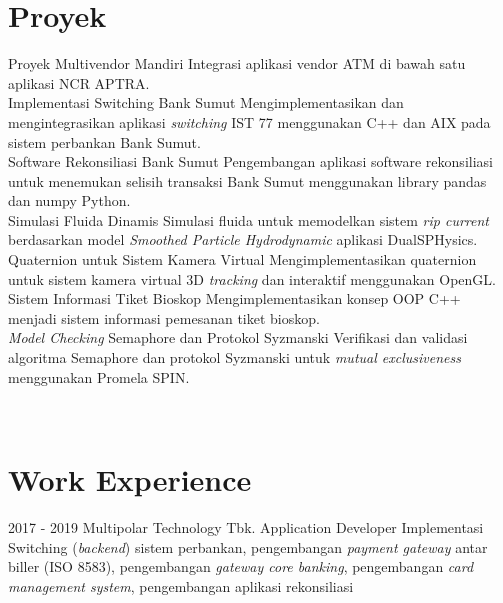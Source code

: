 \documentclass[]{friggeri-cv}
\begin{document}
\section{Proyek}
\begin{entrylist}
  \entry
    {}
    {Proyek Multivendor Mandiri}
    {}
    {Integrasi aplikasi vendor ATM di bawah satu aplikasi NCR APTRA.\\}
  \entry
    {}
    {Implementasi Switching Bank Sumut}
    {}
    {Mengimplementasikan dan mengintegrasikan aplikasi \textit{switching} IST 77 menggunakan C++ dan AIX pada sistem perbankan Bank Sumut.\\}
  \entry
    {}
    {Software Rekonsiliasi Bank Sumut}
    {}
    {Pengembangan aplikasi software rekonsiliasi untuk menemukan selisih transaksi Bank Sumut menggunakan library pandas dan numpy Python.\\}
  \entry
    {}
    {Simulasi Fluida Dinamis}
    {}
    {Simulasi fluida untuk memodelkan sistem \textit{rip current} berdasarkan model \textit{Smoothed Particle Hydrodynamic} aplikasi DualSPHysics.\\}
  \entry
    {}
    {Quaternion untuk Sistem Kamera Virtual}
    {}
    {Mengimplementasikan quaternion untuk sistem kamera virtual 3D \textit{tracking} dan interaktif menggunakan OpenGL.\\}
  \entry
    {}
    {Sistem Informasi Tiket Bioskop}
    {}
    {Mengimplementasikan konsep OOP C++ menjadi sistem informasi pemesanan tiket bioskop.\\}
  \entry
	{}
	{\textit{Model Checking} Semaphore dan Protokol Syzmanski}
	{}
	{Verifikasi dan validasi algoritma Semaphore dan protokol Syzmanski untuk \textit{mutual exclusiveness} menggunakan Promela SPIN.\\}
\end{entrylist}

\\

\section{Work Experience}
\begin{entrylist}
  \entry
    {2017 - 2019}
    {Multipolar Technology Tbk.}
    {Application Developer}
    {Implementasi Switching (\textit{backend}) sistem perbankan, pengembangan \textit{payment gateway} antar biller (ISO 8583), pengembangan \textit{gateway core banking}, pengembangan \textit{card management system}, pengembangan aplikasi rekonsiliasi\\}
\end{entrylist}
\end{document}
